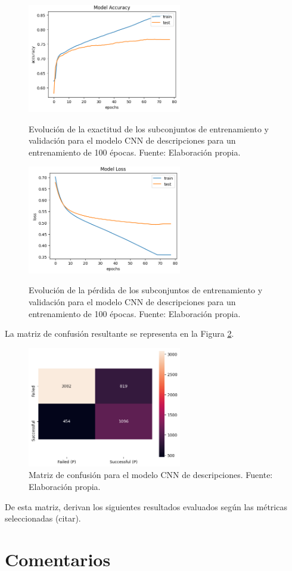 \begin{figure}[htbp]
	\begin{center}
		\includegraphics[width=0.60\textwidth]{4/figures/description_model_accuracy.png}
		\caption{Evolución de la exactitud de los subconjuntos de entrenamiento y validación para el modelo CNN de descripciones para un entrenamiento de 100 épocas. Fuente: Elaboración propia.}
		\label{5:fig4}
		\includegraphics[width=0.60\textwidth]{4/figures/description_model_loss.png}
		\caption{Evolución de la pérdida de los subconjuntos de entrenamiento y validación para el modelo CNN de descripciones para un entrenamiento de 100 épocas. Fuente: Elaboración propia.}
		\label{5:fig5}
	\end{center}
\end{figure}

La matriz de confusión resultante se representa en la Figura \ref{5:fig6}.

\begin{figure}[!ht]
	\begin{center}
		\includegraphics[width=0.60\textwidth]{4/figures/description_confusion_matrix.png}
		\caption{Matriz de confusión para el modelo CNN de descripciones. Fuente: Elaboración propia.}
		\label{5:fig6}
	\end{center}
\end{figure}

De esta matriz, derivan los siguientes resultados evaluados según las métricas seleccionadas (citar).

\section{Comentarios}

